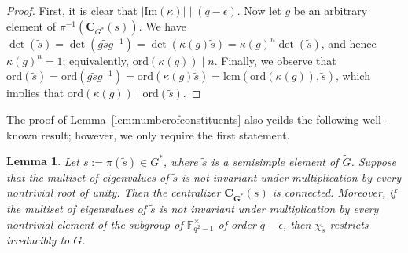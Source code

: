 \documentclass[12pt]{amsart}
\newtheorem{lemma}[theorem]{Lemma}
\theoremstyle{definition}
\numberwithin{equation}{section}
\newcommand{\ord}{{\mathrm {ord}}}
\renewcommand{\Im}{{\mathrm {Im}}}
\newcommand{\lcm}{{\mathrm {lcm}}}
\newcommand{\FF}{{\mathbb F}}
\newcommand{\bC}{{\mathbf{C}}}
\newcommand{\bG}{{\mathbf{G}}}
\newcommand{\bZ}{{\mathbf{Z}}}
\begin{document}
\begin{proof}
First, it is clear that $|\Im(\kappa)|\mid (q-\epsilon)$. Now let
$g$ be an arbitrary element of $\pi^{-1}(\bC_{G^*}(s))$. We have
$\det(\widetilde{s})=\det(g\widetilde{s}g^{-1})=\det(\kappa(g)\widetilde{s})=\kappa(g)^n\det(\widetilde{s})$,
and hence $\kappa(g)^n=1$; equivalently, $\ord(\kappa(g))\mid n$.
Finally, we observe that
$\ord(\widetilde{s})=\ord(g\widetilde{s}g^{-1})=\ord(\kappa(g)\widetilde{s})=\lcm(\ord(\kappa(g)),\widetilde{s})$,
which implies that $\ord(\kappa(g))\mid \ord(\widetilde{s})$.
\end{proof}

The proof of Lemma~\ref{lem:numberofconstituents} also yeilds the
following well-known result; however, we only require the first
statement.

\begin{lemma}\label{lem:2}
Let $s := \pi(\widetilde{s}) \in G^*$, where $\widetilde{s}$ is a
semisimple element of $\widetilde{G}$. Suppose that the multiset of
eigenvalues of $\widetilde{s}$ is not invariant under multiplication
by every nontrivial root of unity. Then the centralizer
$\bC_{\bG^*}(s)$ is connected. Moreover, if the multiset of
eigenvalues of $\widetilde{s}$ is not invariant under multiplication
by every nontrivial element of the subgroup of $\FF_{q^2-1}^\times$
of order $q-\epsilon$, then $\chi_{\widetilde{s}}$ restricts
irreducibly to $G$.
\end{lemma}
\end{document}
